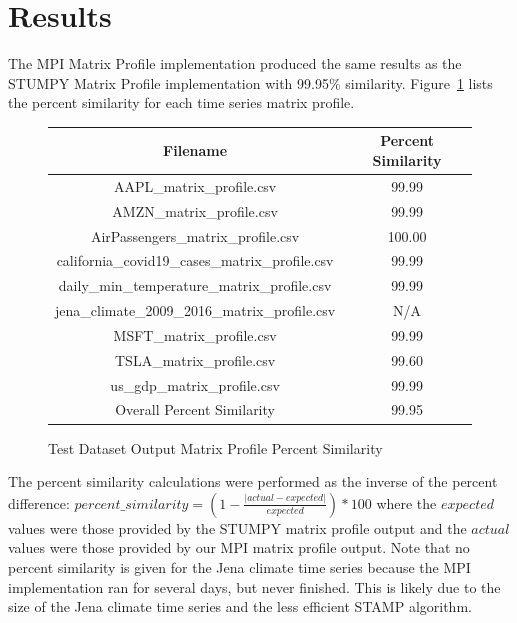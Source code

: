 \documentclass[conference]{IEEEtran}
\begin{document}
\section{Results}

The MPI Matrix Profile implementation produced the same results as the STUMPY Matrix Profile implementation with 99.95\% similarity.  Figure~\ref{fig:Matrix_Profile_Percent_Similarity} lists the percent similarity for each time series matrix profile. 

\begin{figure}
\begin{center}
\begin{tabular}{|c|c|}
\hline
\textbf{Filename} & \textbf{Percent Similarity} \\ \hline \hline
AAPL\_matrix\_profile.csv & 99.99 \\ \hline
AMZN\_matrix\_profile.csv & 99.99 \\ \hline
AirPassengers\_matrix\_profile.csv & 100.00 \\ \hline
california\_covid19\_cases\_matrix\_profile.csv & 99.99 \\ \hline
daily\_min\_temperature\_matrix\_profile.csv & 99.99 \\ \hline
jena\_climate\_2009\_2016\_matrix\_profile.csv & N/A \\ \hline
MSFT\_matrix\_profile.csv & 99.99 \\ \hline
TSLA\_matrix\_profile.csv & 99.60 \\ \hline
us\_gdp\_matrix\_profile.csv & 99.99 \\ \hline \hline
Overall Percent Similarity & 99.95 \\ \hline
\hline
\end{tabular}
\caption{Test Dataset Output Matrix Profile Percent Similarity}
\label{fig:Matrix_Profile_Percent_Similarity}
\end{center}
\end{figure}

The percent similarity calculations were performed as the inverse of the percent difference: $percent\_similarity = \left(1 - \frac{|actual - expected|}{expected}\right) * 100$ where the $expected$ values were those provided by the STUMPY matrix profile output and the $actual$ values were those provided by our MPI matrix profile output. Note that no percent similarity is given for the Jena climate time series because the MPI implementation ran for several days, but never finished.  This is likely due to the size of the Jena climate time series and the less efficient STAMP algorithm.
\end{document}
